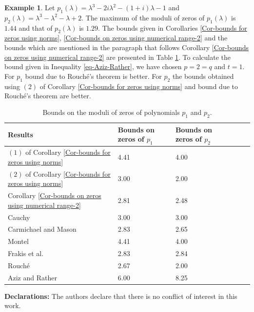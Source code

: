 \documentclass[12pt, reqno]{amsart}
\theoremstyle{definition}
\newtheorem{example}[theorem]{Example}
\theoremstyle{remark}
\numberwithin{equation}{section}
\begin{document}
\begin{example}\label{ex-polynomial-1}
Let $p_1(\lambda) = \lambda^3- 2i \lambda^2 - (1+i)\lambda-1$ and 
$p_2(\lambda) = \lambda^3 - \lambda^2 - \lambda+2$. The maximum of the moduli of 
zeros of $p_1(\lambda)$ is $1.44$ and that of $p_2(\lambda)$ is $1.29$. The bounds 
given in Corollaries \ref{Cor-bounds for zeros using norms}, 
\ref{Cor-bounds on zeros using numerical range-2} and the bounds which are mentioned 
in the paragraph that follows Corollary \ref{Cor-bounds on zeros using numerical range-2}
are presented in Table \ref{table:4}. To calculate the bound given in Inequality \eqref{eq-Aziz-Rather}, 
we have chosen $p=2=q$ and $t=1$. For $p_1$ bound due to Rouch\'e's theorem is better. 
For $p_2$ the bounds obtained using $(2)$ of Corollary \ref{Cor-bounds for zeros using norms} 
and bound due to Rouch\'e's theorem are better.  

\begin{table}[h!]
\centering
\begin{tabular}{l l l l l l}
\hline
Results & Bounds on zeros of $p_1$ & Bounds on zeros of $p_2$ \\ [0.5ex] 
\hline

$(1)$ of Corollary \ref{Cor-bounds for zeros using norms} & 4.41 & 4.00\\
$(2)$ of Corollary \ref{Cor-bounds for zeros using norms} & 3.00 & 2.00\\
Corollary \ref{Cor-bounds on zeros using numerical range-2} & 2.81 & 2.48\\
Cauchy \cite{Horn-Johnson} & 3.00 & 3.00\\
Carmichael and Mason \cite{Horn-Johnson} & 2.83 & 2.65\\
Montel \cite{Horn-Johnson} & 4.41 & 4.00\\
Frakis et al. \cite{Abdelkader-Faud-Soumia} & 2.83 & 2.84\\
Rouch\'e \cite{Cauchy} & 2.67 & 2.00\\
Aziz and Rather \cite{Aziz-Rather} & 6.00 & 8.25\\[1ex] 
\hline
\end{tabular}
\vspace{0.2cm}
\caption{Bounds on the moduli of zeros of polynomials $p_1$ and $p_2$.}
\label{table:4}
\end{table}   
\end{example} 

\newpage
\medskip
\noindent
{\bf Declarations:} The authors declare that there is no conflict of interest in 
this work. 
\end{document}
